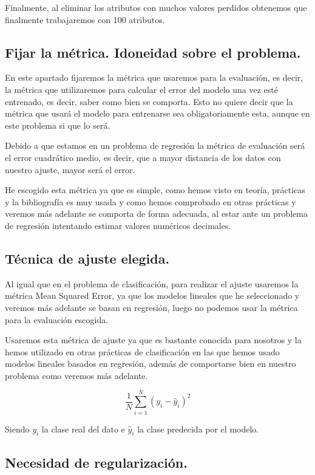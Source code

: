 \documentclass[12pt, spanish]{article}
\begin{document}
Finalmente, al eliminar los atributos con muchos valores perdidos obtenemos que finalmente trabajaremos con 100 atributos.

\subsection{Fijar la métrica. Idoneidad sobre el problema.}

En este apartado fijaremos la métrica que usaremos para la evaluación, es decir, la métrica que utilizaremos para calcular el error del modelo una vez esté entrenado, es decir, saber como bien se comporta. Esto no quiere decir que la métrica que usará el modelo para entrenarse sea obligatoriamente esta, aunque en este problema si que lo será.


Debido a que estamos en un problema de regresión la métrica de evaluación será el error cuadrático medio\cite{meanSquareError}, es decir, que a mayor distancia de los datos con nuestro ajuste, mayor será el error.

He escogido esta métrica ya que es simple, como hemos visto en teoría, prácticas y la bibliografía es muy usada y como hemos comprobado en otras prácticas y veremos más adelante se comporta de forma adecuada, al estar ante un problema de regresión intentando estimar valores numéricos decimales.


\subsection{Técnica de ajuste elegida.}

Al igual que en el problema de clasificación, para realizar el ajuste usaremos la métrica Mean Squared Error, ya que los modelos lineales que he seleccionado y veremos más adelante se basan en regresión, luego no podemos usar la métrica para la evaluación escogida. 

Usaremos esta métrica de ajuste ya que es bastante conocida para nosotros y la hemos utilizado en otras prácticas de clasificación en las que hemos usado modelos lineales basados en regresión, además de comportarse bien en nuestro problema como veremos más adelante.


$$ \frac{1}{N} \sum_{i=1}^{N}{(y_i - \hat{y}_i)^2} $$

Siendo $y_i$ la clase real del dato e $\hat{y}_i$ la clase predecida por el modelo.


\subsection{Necesidad de regularización.}
\end{document}
